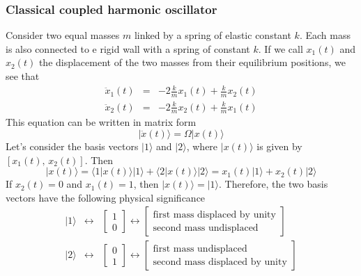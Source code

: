 \documentclass[11pt,fleqn]{book} %
\newcommand{\ket}[1]{| #1\rangle}
\newcommand{\scalar}[2]{\langle #1| #2\rangle}
\begin{document}
\subsubsection{Classical coupled harmonic oscillator}
Consider two equal masses $m$ linked by a spring of elastic constant $k$. Each mass is also connected to e rigid wall with a spring of 
constant $k$. If we call $x_1(t)$ and $x_2(t)$ the displacement of the two masses from their equilibrium positions, we see that
\begin{subequations}
    \label{eq:classic_ho_diff_eq}
    \begin{eqnarray}
        \ddot{x}_1(t) &=& -2\frac{k}{m}x_1(t) + \frac{k}{m}x_2(t) \\
        \ddot{x}_2(t) &=& -2\frac{k}{m}x_2(t) + \frac{k}{m}x_1(t)
    \end{eqnarray}
\end{subequations}
This equation can be written in matrix form
\begin{equation}
    \label{eq:classic_ho_diff_eq_vect}
    \ket{\ddot{x}(t)} = \Omega\ket{x(t)}
\end{equation}
Let's consider the basis vectors $\ket{1}$ and $\ket{2}$, where $\ket{x(t)}$ is given by $\left[x_1(t),\,x_2(t)\right]$. Then
\begin{equation*}
    \ket{x(t)} = \scalar{1}{x(t)}\ket{1} + \scalar{2}{x(t)}\ket{2} = x_1(t)\ket{1} + x_2(t)\ket{2}
\end{equation*}
If $x_2(t)=0$ and $x_1(t)=1$, then $\ket{x(t)} = \ket{1}$. Therefore, the two basis vectors have the following physical significance
\begin{eqnarray*}
    \ket{1}&\leftrightarrow&\left[\begin{array}{c}
        1\\
        0
    \end{array}\right] \leftrightarrow\left[\begin{array}{c}
        \mbox{first mass displaced by unity}\\
        \mbox{second mass undisplaced}
    \end{array}\right]
    \\
    \ket{2}&\leftrightarrow&\left[\begin{array}{c}
        0\\
        1
    \end{array}\right] \leftrightarrow\left[\begin{array}{c}
        \mbox{first mass undisplaced}
        \\
        \mbox{second mass displaced by unity}
    \end{array}\right]
\end{eqnarray*}
\end{document}
